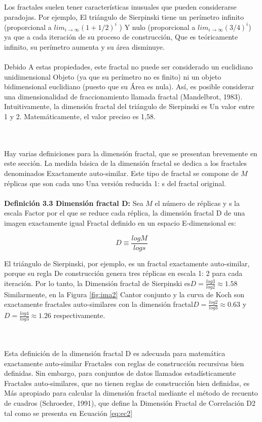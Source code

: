 Los fractales suelen tener características inusuales que pueden considerarse paradojas. Por ejemplo,
El triángulo de Sierpinski tiene un perímetro infinito (proporcional a $lim_{i\rightarrow\infty} (1+1/2)^i  $ )
Y nulo (proporcional a $lim_{i\rightarrow\infty} (3/4)^i $) ya que a cada iteración de su proceso de construcción,
Que es teóricamente infinito, su perímetro aumenta y su área disminuye.
\\\\
Debido
A estas propiedades, este fractal no puede ser considerado un euclidiano unidimensional
Objeto (ya que su perímetro no es finito) ni un objeto bidimensional euclidiano (puesto que su
Área es nula). Así, es posible considerar una dimensionalidad de fraccionamiento llamada fractal
(Mandelbrot, 1983). Intuitivamente, la dimensión fractal del triángulo de Sierpinski es
Un valor entre 1 y 2. Matemáticamente, el valor preciso es 1,58.

\\\\
Hay varias definiciones para la dimensión fractal, que se presentan brevemente en este
sección. La medida básica de la dimensión fractal se dedica a los fractales denominados
Exactamente auto-similar. Este tipo de fractal se compone de $M$ réplicas que son cada uno
Una versión reducida 1: s del fractal original.
\\\\
\textbf{Definición 3.3 Dimensión fractal D:} Sea $M$ el número de réplicas y s la escala
Factor por el que se reduce cada réplica, la dimensión fractal D de una imagen exactamente igual Fractal definido en un espacio E-dimensional es:

\begin{equation}
D \equiv \frac{logM}{logs}
\label{eq:ec1}
\end{equation}

El triángulo de Sierpinski, por ejemplo, es un fractal exactamente auto-similar, porque su regla
De construcción genera tres réplicas en escala 1: 2 para cada iteración. Por lo tanto, la
Dimensión fractal de Sierpinski es$ D = \frac{log3}{log2} \approx 1.58$ Similarmente, en la Figura \ref{fig:ima2}
Cantor conjunto y la curva de Koch son exactamente fractales auto-similares con la dimensión fractal$ D = \frac{log2}{log3} \approx 0.63$ y $ D = \frac{log4}{log3} \approx 1.26$ respectivamente.

\\\\
Esta definición de la dimensión fractal D es adecuada para matemática exactamente auto-similar
Fractales con reglas de construcción recursivas bien definidas. Sin embargo, para conjuntos de datos llamados estadísticamente
Fractales auto-similares, que no tienen reglas de construcción bien definidas, es
Más apropiado para calcular la dimensión fractal mediante el método de recuento de cuadros
(Schroeder, 1991), que define la Dimensión Fractal de Correlación D2 tal como se presenta en
Ecuación \ref{eq:ec2}
\\\\

